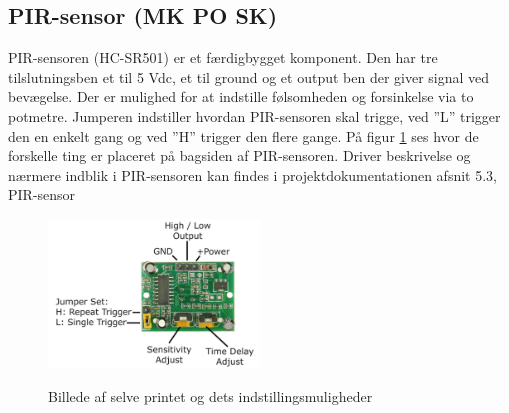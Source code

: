 \subsection{PIR-sensor (MK PO SK)}

PIR-sensoren (HC-SR501) er et færdigbygget komponent. Den har tre tilslutningsben et til 5 Vdc, et til ground og et output ben der giver signal ved bevægelse. Der er mulighed for at indstille følsomheden og forsinkelse via to potmetre. Jumperen indstiller hvordan PIR-sensoren skal trigge, ved ''L'' trigger den en enkelt gang og ved ''H'' trigger den flere gange. På figur \ref{lab:pir_overview} ses hvor de forskelle ting er placeret på bagsiden af PIR-sensoren. Driver beskrivelse og nærmere indblik i PIR-sensoren kan findes i projektdokumentationen afsnit 5.3, PIR-sensor

\begin{figure}[H] \centering
{\includegraphics[width=0.5\textwidth]{Billeder/pir_overview}}
\caption{Billede af selve printet og dets indstillingsmuligheder}
\label{lab:pir_overview}
\raggedright
\end{figure}



